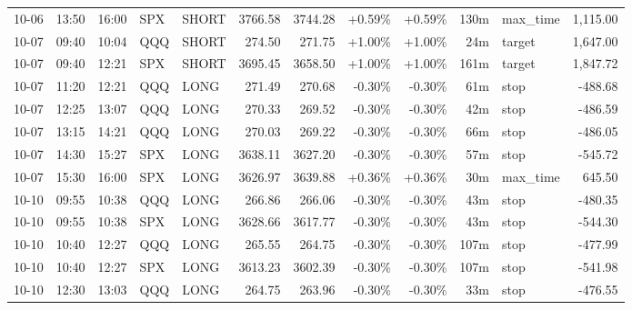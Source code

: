 \documentclass[11pt,a4paper,twoside]{article}
\begin{document}
\begin{center}
\begin{longtable}{>{\color{txtmain}}l l l l l r r r r r >{\color{txtmain}}l r}
10-06 & 13:50 & 16:00 & SPX & SHORT & 3766.58 & 3744.28 & \textcolor{wingreen}{+0.59\%} & \textcolor{wingreen}{+0.59\%} & 130m & max\_time & \textcolor{wingreen}{1,115.00} \\
10-07 & 09:40 & 10:04 & QQQ & SHORT & 274.50 & 271.75 & \textcolor{wingreen}{+1.00\%} & \textcolor{wingreen}{+1.00\%} & 24m & target & \textcolor{wingreen}{1,647.00} \\
10-07 & 09:40 & 12:21 & SPX & SHORT & 3695.45 & 3658.50 & \textcolor{wingreen}{+1.00\%} & \textcolor{wingreen}{+1.00\%} & 161m & target & \textcolor{wingreen}{1,847.72} \\
10-07 & 11:20 & 12:21 & QQQ & LONG & 271.49 & 270.68 & \textcolor{lossred}{-0.30\%} & \textcolor{lossred}{-0.30\%} & 61m & stop & \textcolor{lossred}{-488.68} \\
10-07 & 12:25 & 13:07 & QQQ & LONG & 270.33 & 269.52 & \textcolor{lossred}{-0.30\%} & \textcolor{lossred}{-0.30\%} & 42m & stop & \textcolor{lossred}{-486.59} \\
10-07 & 13:15 & 14:21 & QQQ & LONG & 270.03 & 269.22 & \textcolor{lossred}{-0.30\%} & \textcolor{lossred}{-0.30\%} & 66m & stop & \textcolor{lossred}{-486.05} \\
10-07 & 14:30 & 15:27 & SPX & LONG & 3638.11 & 3627.20 & \textcolor{lossred}{-0.30\%} & \textcolor{lossred}{-0.30\%} & 57m & stop & \textcolor{lossred}{-545.72} \\
10-07 & 15:30 & 16:00 & SPX & LONG & 3626.97 & 3639.88 & \textcolor{wingreen}{+0.36\%} & \textcolor{wingreen}{+0.36\%} & 30m & max\_time & \textcolor{wingreen}{645.50} \\
10-10 & 09:55 & 10:38 & QQQ & LONG & 266.86 & 266.06 & \textcolor{lossred}{-0.30\%} & \textcolor{lossred}{-0.30\%} & 43m & stop & \textcolor{lossred}{-480.35} \\
10-10 & 09:55 & 10:38 & SPX & LONG & 3628.66 & 3617.77 & \textcolor{lossred}{-0.30\%} & \textcolor{lossred}{-0.30\%} & 43m & stop & \textcolor{lossred}{-544.30} \\
10-10 & 10:40 & 12:27 & QQQ & LONG & 265.55 & 264.75 & \textcolor{lossred}{-0.30\%} & \textcolor{lossred}{-0.30\%} & 107m & stop & \textcolor{lossred}{-477.99} \\
10-10 & 10:40 & 12:27 & SPX & LONG & 3613.23 & 3602.39 & \textcolor{lossred}{-0.30\%} & \textcolor{lossred}{-0.30\%} & 107m & stop & \textcolor{lossred}{-541.98} \\
10-10 & 12:30 & 13:03 & QQQ & LONG & 264.75 & 263.96 & \textcolor{lossred}{-0.30\%} & \textcolor{lossred}{-0.30\%} & 33m & stop & \textcolor{lossred}{-476.55} \\

\end{longtable}
\end{center}
\end{document}
